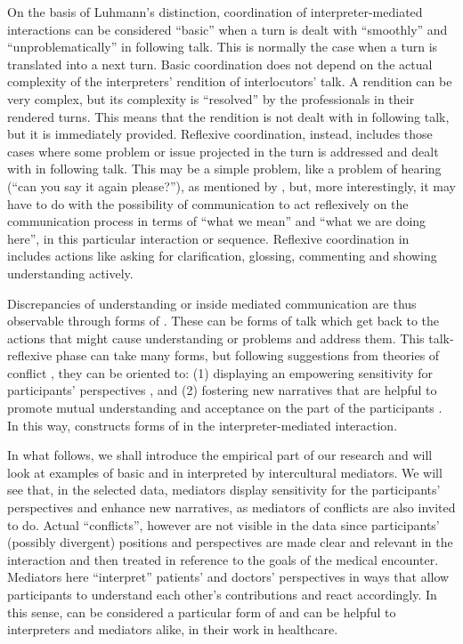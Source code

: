\documentclass[output=paper]{LSP/langsci}
\begin{document}
On the basis of Luhmann's distinction, coordination of interpreter-mediated interactions can be considered ``basic'' when a turn is dealt with ``smoothly'' and ``unproblematically'' in following talk. This is normally the case when a turn is translated into a next turn. Basic coordination does not depend on the actual complexity of the interpreters' rendition of interlocutors' talk. A rendition can be very complex, but its complexity is ``resolved'' by the  professionals in their rendered turns. This means that the rendition is not dealt with in following talk, but it is immediately provided. Reflexive coordination, instead, includes those cases where some  problem or issue projected in the turn is addressed and dealt with in following talk. This may be a simple problem, like a problem of hearing (``can you say it again please?''), as mentioned by \citet{Wadensjo1998}, but, more interestingly, it may have to do with the possibility of communication to act reflexively on the communication process in terms of ``what we mean'' and ``what we are doing here'', in this particular interaction or sequence. Reflexive coordination in  includes actions like asking for clarification, glossing, commenting and showing understanding actively. 

Discrepancies of understanding or  inside mediated communication are thus observable through forms of . These can be forms of talk which get back to the actions that might cause understanding or  problems and address them. This talk-reflexive phase can take many forms, but following suggestions from theories of conflict , they can be oriented to: (1) displaying an empowering sensitivity for participants' perspectives \citep{Bush1994}, and (2) fostering new narratives that are helpful to promote mutual understanding and acceptance on the part of the participants \citep{Winslade2008}. In this way,  constructs forms of  in the interpreter-mediated interaction. 

In what follows, we shall introduce the empirical part of our research and will look at examples of basic and  in  interpreted by intercultural mediators. We will see that, in the selected data, mediators   display sensitivity for the participants' perspectives and enhance new narratives, as mediators of conflicts are also invited to do. Actual ``conflicts'', however are not visible in the data since participants' (possibly divergent) positions and perspectives are made clear and relevant in the interaction and then treated in reference to the goals of the medical encounter. Mediators here ``interpret'' patients' and doctors' perspectives  in ways that allow participants to understand each other's contributions and react accordingly. In this sense,  can be considered a particular form of  and can be helpful to interpreters and mediators alike, in their work in healthcare.
\end{document}
